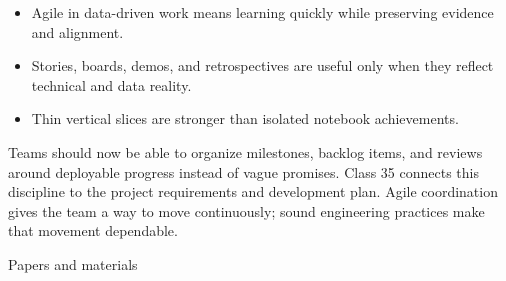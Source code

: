 \classclosingframe
{\begin{itemize}\item Agile in data-driven work means learning quickly while preserving evidence and alignment.\item Stories, boards, demos, and retrospectives are useful only when they reflect technical and data reality.\item Thin vertical slices are stronger than isolated notebook achievements.\end{itemize}}
{Teams should now be able to organize milestones, backlog items, and reviews around deployable progress instead of vague promises.}
{Class 35 connects this discipline to the project requirements and development plan.}
{Agile coordination gives the team a way to move continuously; sound engineering practices make that movement dependable.}

\begin{frame}{Papers and materials}
\coursefooter
\end{frame}

